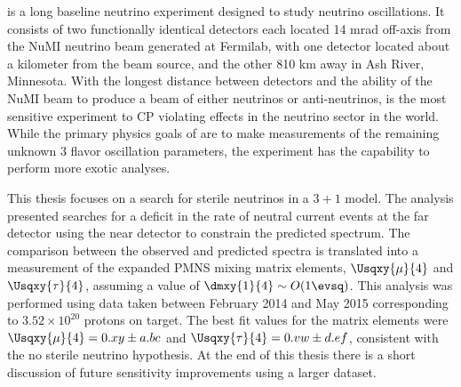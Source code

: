 
\nova is a long baseline neutrino experiment designed to study neutrino oscillations. It consists of two functionally identical detectors each located 14 mrad off-axis from the NuMI neutrino beam generated at Fermilab, with one detector located about a kilometer from the beam source, and the other 810 km away in Ash River, Minnesota. With the longest distance between detectors and the ability of the NuMI beam to produce a beam of either neutrinos or anti-neutrinos, \nova is the most sensitive experiment to CP violating effects in the neutrino sector in the world. While the primary physics goals of \nova are to make measurements of the remaining unknown 3 flavor oscillation parameters, the experiment has the capability to perform more exotic analyses.

This thesis focuses on a search for sterile neutrinos in a $3 + 1$ model. The analysis presented searches for a deficit in the rate of neutral current events at the far detector using the near detector to constrain the predicted spectrum. The comparison between the observed and predicted spectra is translated into a measurement of the expanded PMNS mixing matrix elements, $\Usqxy{\mu}{4}$ and $\Usqxy{\tau}{4}$, assuming a value of $\dmxy{1}{4} \sim O(1 \evsq)$. This analysis was performed using data taken between February 2014 and May 2015 corresponding to $3.52 \times 10^{20}$ protons on target. The best fit values for the matrix elements were $\Usqxy{\mu}{4} = 0.xy \pm a.bc$ and $\Usqxy{\tau}{4} = 0.vw \pm d.ef$, consistent with the no sterile neutrino hypothesis. At the end of this thesis there is a short discussion of future sensitivity improvements using a larger dataset.